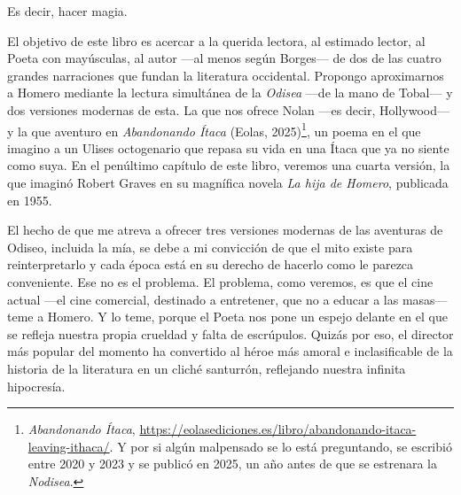 Es decir, hacer magia.

El objetivo de este libro es acercar a la querida lectora, al estimado lector, al Poeta con mayúsculas, al autor ---al menos según Borges--- de dos de las cuatro grandes narraciones que fundan la literatura occidental. Propongo aproximarnos a Homero mediante la lectura simultánea de la \emph{Odisea} ---de la mano de Tobal--- y dos versiones modernas de esta. La que nos ofrece Nolan ---es decir, Hollywood--- y la que aventuro en \emph{Abandonando Ítaca} (Eolas, 2025)\footnote{\emph{Abandonando Ítaca}, \url{https://eolasediciones.es/libro/abandonando-itaca-leaving-ithaca/}. Y por si algún malpensado se lo está preguntando, se escribió entre 2020 y 2023 y se publicó en 2025, un año antes de que se estrenara la \emph{Nodisea}.}, un poema en el que imagino a un Ulises octogenario que repasa su vida en una Ítaca que ya no siente como suya. En el penúltimo capítulo de este libro, veremos una cuarta versión, la que imaginó Robert Graves en su magnífica novela \emph{La hija de Homero}, publicada en 1955.

El hecho de que me atreva a ofrecer tres versiones modernas de las aventuras de Odiseo, incluida la mía, se debe a mi convicción de que el mito existe para reinterpretarlo y cada época está en su derecho de hacerlo como le parezca conveniente. Ese no es el problema.
El problema, como veremos, es que el cine actual ---el cine comercial, destinado a entretener, que no a educar a las masas--- teme a Homero. Y lo teme, porque el Poeta nos pone un espejo delante en el que se refleja nuestra propia crueldad y falta de escrúpulos. Quizás por eso, el director más popular del momento ha convertido al héroe más amoral e inclasificable de la historia de la literatura en un cliché santurrón, reflejando nuestra infinita hipocresía.

